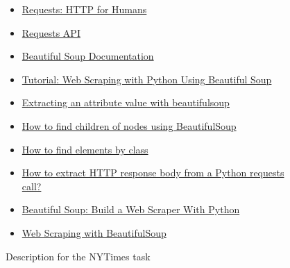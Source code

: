 \begin{figure}
\begin{mdframed}[backgroundcolor=gray!04]
\begin{scriptsize}
\begin{itemize}
    \item \href{https://docs.python-requests.org/en/latest/}{Requests: HTTP for Humans}
    \item \href{https://docs.python-requests.org/en/latest/api/}{Requests API}
    \item \href{https://www.crummy.com/software/BeautifulSoup/bs4/doc/}{Beautiful Soup Documentation}
    \item \href{https://www.dataquest.io/blog/web-scraping-python-using-beautiful-soup/}{Tutorial: Web Scraping with Python Using Beautiful Soup}
    \item \href{https://stackoverflow.com/questions/2612548/extracting-an-attribute-value-with-beautifulsoup}{Extracting an attribute value with beautifulsoup}
    \item \href{https://stackoverflow.com/questions/6287529/how-to-find-children-of-nodes-using-beautifulsoup}{How to find children of nodes using BeautifulSoup}
    \item \href{https://stackoverflow.com/questions/5041008/how-to-find-elements-by-class}{How to find elements by class}
    \item \href{https://stackoverflow.com/questions/9029287/how-to-extract-http-response-body-from-a-python-requests-call}{How to extract HTTP response body from a Python requests call?} 
    \item \href{https://realpython.com/beautiful-soup-web-scraper-python/}{Beautiful Soup: Build a Web Scraper With Python}
    \item \href{https://www.scrapingbee.com/blog/python-web-scraping-beautiful-soup/}{Web Scraping with BeautifulSoup}
\end{itemize}

\end{scriptsize}
\end{mdframed}
\caption{Description for the NYTimes task}
\end{figure}

    